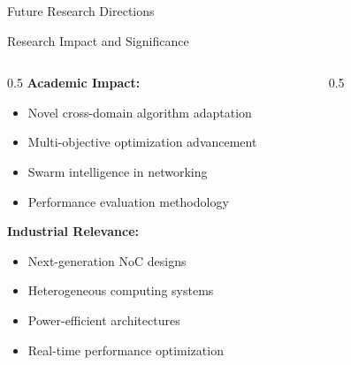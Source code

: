 \documentclass[10pt]{beamer}
\begin{document}
\begin{frame}{Future Research Directions}
\begin{frame}{Research Impact and Significance}
    \begin{columns}
        \begin{column}{0.5\textwidth}
            \textbf{Academic Impact:}
            \begin{itemize}
                \item Novel cross-domain algorithm adaptation
                \item Multi-objective optimization advancement
                \item Swarm intelligence in networking
                \item Performance evaluation methodology
            \end{itemize}
            
            \textbf{Industrial Relevance:}
            \begin{itemize}
                \item Next-generation NoC designs
                \item Heterogeneous computing systems
                \item Power-efficient architectures
                \item Real-time performance optimization
            \end{itemize}
        \end{column}
        \begin{column}{0.5\textwidth}
            \begin{figure}
                \centering
            \end{figure}
        \end{column}
    \end{columns}
    

\end{frame}
\end{frame}
\end{document}
